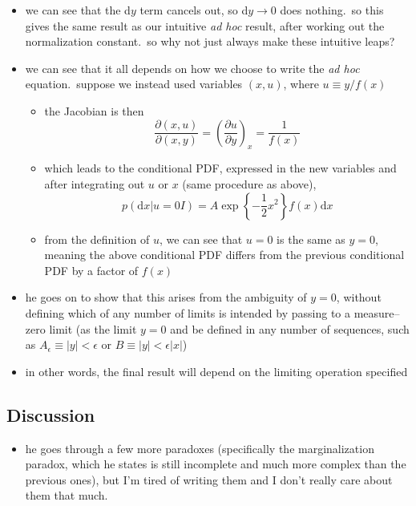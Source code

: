 \documentclass[../jaynes_prob_theory_notes.tex]{subfiles}
\begin{document}
\begin{itemize}
                \item we can see that the d\(y\) term cancels out, so d\(y \rightarrow 0\) does nothing.\ so this gives the same result as our intuitive \textit{ad hoc} result, after working out the normalization constant.\ so why not just always make these intuitive leaps?
                \item we can see that it all depends on how we choose to write the \textit{ad hoc} equation.\ suppose we instead used variables \((x,u)\), where \(u \equiv y/f(x)\)
                    \begin{itemize} 
                        \item the Jacobian is then
                            \begin{equation*} 
                                \frac{\partial (x,u)}{\partial (x,y)} = {\left( \frac{\partial u}{\partial y} \right)}_x = \frac{1}{f(x)}
                            \end{equation*}
                        \item which leads to the conditional PDF, expressed in the new variables and after integrating out \(u\) or \(x\) (same procedure as above),
                            \begin{equation*} 
                                p(\text{d}x|u = 0 I) = A\exp \left \{ -\frac{1}{2} x^2 \right \} f(x)\text{d}x
                            \end{equation*}
                        \item from the definition of \(u\), we can see that \(u = 0\) is the same as \(y = 0\), meaning the above conditional PDF differs from the previous conditional PDF by a factor of \(f(x)\)
                    \end{itemize}
                \item he goes on to show that this arises from the ambiguity of \(y=0\), without defining which of any number of limits is intended by passing to a measure--zero limit (as the limit \(y = 0\) and be defined in any number of sequences, such as \(A_{\epsilon} \equiv |y| < \epsilon\) or \(B\equiv |y| < \epsilon |x|\))
                \item in other words, the final result will depend on the limiting operation specified
            \end{itemize}

        \subsection{Discussion}
            \begin{itemize} 
                \item he goes through a few more paradoxes (specifically the marginalization paradox, which he states is still incomplete and much more complex than the previous ones), but I'm tired of writing them and I don't really care about them that much.
            \end{itemize}
\end{document}
